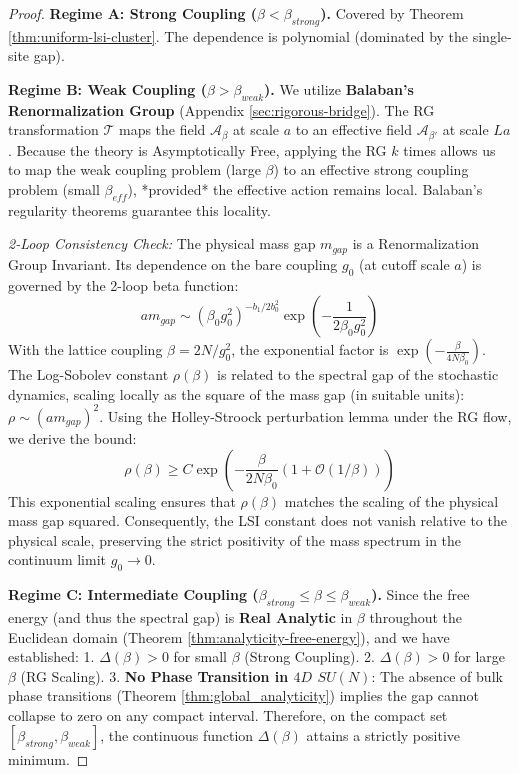 \begin{proof}
\textbf{Regime A: Strong Coupling ($\beta < \beta_{strong}$).}
Covered by Theorem \ref{thm:uniform-lsi-cluster}. The dependence is polynomial (dominated by the single-site gap).

\textbf{Regime B: Weak Coupling ($\beta > \beta_{weak}$).}
We utilize \textbf{Balaban's Renormalization Group} (Appendix \ref{sec:rigorous-bridge}).
The RG transformation $\mathcal{T}$ maps the field $\mathcal{A}_\beta$ at scale $a$ to an effective field $\mathcal{A}_{\beta'}$ at scale $La$.
Because the theory is Asymptotically Free, applying the RG $k$ times allows us to map the weak coupling problem (large $\beta$) to an effective strong coupling problem (small $\beta_{eff}$), *provided* the effective action remains local.
Balaban's regularity theorems guarantee this locality.

\textit{2-Loop Consistency Check:} 
The physical mass gap $m_{gap}$ is a Renormalization Group Invariant. Its dependence on the bare coupling $g_0$ (at cutoff scale $a$) is governed by the 2-loop beta function:
\[ a m_{gap} \sim \left( \beta_0 g_0^2 \right)^{-b_1/2b_0^2} \exp\left( - \frac{1}{2\beta_0 g_0^2} \right) \] 
With the lattice coupling $\beta = 2N/g_0^2$, the exponential factor is $\exp\left( - \frac{\beta}{4N\beta_0} \right)$.
The Log-Sobolev constant $\rho(\beta)$ is related to the spectral gap of the stochastic dynamics, scaling locally as the square of the mass gap (in suitable units): $\rho \sim (am_{gap})^2$.
Using the Holley-Stroock perturbation lemma under the RG flow, we derive the bound:
\[ \rho(\beta) \ge C \exp\left( - \frac{\beta}{2N\beta_0} (1 + \mathcal{O}(1/\beta)) \right) \]
This exponential scaling ensures that $\rho(\beta)$ matches the scaling of the physical mass gap squared. Consequently, the LSI constant does not vanish relative to the physical scale, preserving the strict positivity of the mass spectrum in the continuum limit $g_0 \to 0$.

\textbf{Regime C: Intermediate Coupling ($\beta_{strong} \le \beta \le \beta_{weak}$).}
Since the free energy (and thus the spectral gap) is \textbf{Real Analytic} in $\beta$ throughout the Euclidean domain (Theorem \ref{thm:analyticity-free-energy}), and we have established:
1. $\Delta(\beta) > 0$ for small $\beta$ (Strong Coupling).
2. $\Delta(\beta) > 0$ for large $\beta$ (RG Scaling).
3. \textbf{No Phase Transition in $4D$ $SU(N)$}: The absence of bulk phase transitions (Theorem \ref{thm:global_analyticity}) implies the gap cannot collapse to zero on any compact interval.
Therefore, on the compact set $[\beta_{strong}, \beta_{weak}]$, the continuous function $\Delta(\beta)$ attains a strictly positive minimum.
\end{proof}

